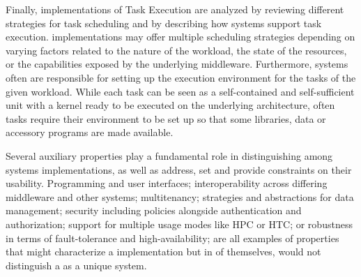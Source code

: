 \documentclass{sig-alternate}
\begin{document}

Finally, implementations of Task Execution are analyzed by reviewing different
strategies for task scheduling and by describing how \pilotjob systems support
task execution. \pilotjob implementations may offer multiple scheduling
strategies depending on varying factors related to the nature of the workload,
the state of the resources, or the capabilities exposed by the underlying
middleware. Furthermore, \pilotjob systems often are responsible for setting up
the execution environment for the tasks of the given workload. While each task
can be seen as a self-contained and self-sufficient unit with a kernel ready to
be executed on the underlying architecture, often tasks require their
environment to be set up so that some libraries, data or accessory programs
are made available.

Several auxiliary properties play a fundamental role in distinguishing
among \pilotjob systems implementations, as well as address, set and
provide constraints on their usability.  Programming and user
interfaces; interoperability across differing middleware and other
\pilotjob systems; multitenancy; strategies and abstractions for data
management; security including policies alongside authentication and
authorization; support for multiple usage modes like HPC or HTC; or
robustness in terms of fault-tolerance and high-availability; are all
examples of properties that might characterize a \pilotjob
implementation but in of themselves, would not distinguish a \pilotjob
as a unique system.

\end{document}
